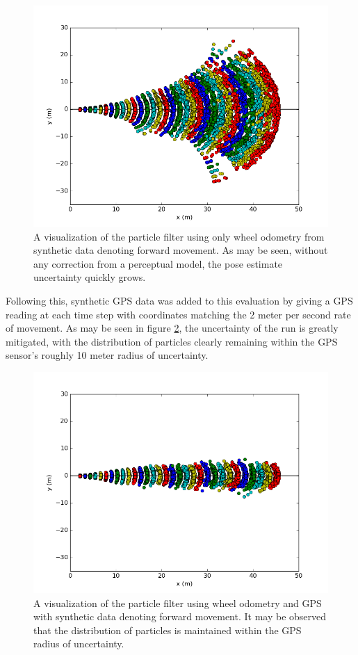 \documentclass[letterpaper, 12 pt, conference]{ieeeconf}  %
\begin{document}
\begin{figure}[h]
\centering
\includegraphics[scale=01.0]{NO_GPS}
\caption{A visualization of the particle filter using only wheel odometry from synthetic data denoting forward movement. As may be seen, without any correction from a perceptual model, the pose estimate uncertainty quickly grows.}
\label{odometry_error}
\end{figure}

Following this, synthetic GPS data was added to this evaluation by giving a GPS reading at each time step with coordinates matching the 2 meter per second rate of movement. As may be seen in figure \ref{with_gps}, the uncertainty of the run is greatly mitigated, with the distribution of particles clearly remaining within the GPS sensor's roughly 10 meter radius of uncertainty. 

\begin{figure}[h]
\centering
\includegraphics[scale=.9]{With_GPS}
\caption{A visualization of the particle filter using wheel odometry and GPS with synthetic data denoting forward movement. It may be observed that the distribution of particles is maintained within the GPS radius of uncertainty. }
\label{with_gps}
\end{figure}
\end{document}
